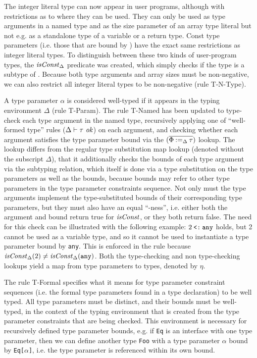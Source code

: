 The integer literal type can now appear in user programs, although with
restrictions as to where they can be used. They can only be used as type
arguments in a named type and as the size parameter of an array type literal but
not e.g. as a standalone type of a variable or a return type. Const type
parameters (i.e. those that are bound by ) have the exact same
restrictions as integer literal types. To distinguish between these two kinds of
user-program types, the $\mathit{isConst}_\Delta$ predicate was created, which simply
checks if the type is a subtype of . Because both  type
arguments and array sizes must be non-negative, we can also restrict all integer
literal types to be non-negative (rule T-N-Type).

A type parameter $\alpha$ is considered well-typed if it appears in the typing
environment $\Delta$ (rule T-Param). The rule T-Named has been updated to
type-check each type argument in the named type, recursively applying one of
``well-formed type'' rules ($\Delta \vdash \tau ~\mathit{ok}$) on each argument, and
checking whether each argument satisfies the type parameter bound via the
$(\overline{\Phi \mathbin{:=}_\Delta \tau})$ lookup. The lookup differs from the regular type
substitution map lookup (denoted without the subscript $\Delta$), that it
additionally checks the bounds of each type argument via the subtyping relation,
which itself is done via a type substitution on the type parameters as well as
the bounds, because bounds may refer to other type parameters in the type
parameter constraints sequence. Not only must the type arguments implement the
type-substituted bounds of their corresponding type parameters, but they must
also have an equal ``-ness'', i.e. either both the argument and bound
return true for $\mathit{isConst}$, or they both return false. The need for this check
can be illustrated with the following example: $2 \mathbin{\texttt{<:}} \texttt{any}$ holds, but
2 cannot be used as a variable type, and so it cannot be used to instantiate a
type parameter bound by \texttt{any}. This is enforced in the rule because
$\mathit{isConst}_\Delta(2) \neq \mathit{isConst}_\Delta(\texttt{any})$. Both the type-checking
and non type-checking lookups yield a map from type parameters to types, denoted
by $\eta$.

The rule T-Formal specifies what it means for type parameter constraint
sequences (i.e. the formal type parameters found in a type declaration) to be
well typed. All type parameters must be distinct, and their bounds must be
well-typed, in the context of the typing environment that is created from the
type parameter constraints that are being checked. This environment is necessary
for recursively defined type parameter bounds, e.g. if \texttt{Eq} is an
interface with one type parameter, then we can define another type \texttt{Foo}
with a type parameter $\alpha$ bound by \texttt{Eq[$\alpha$]}, i.e. the type
parameter is referenced within its own bound.

